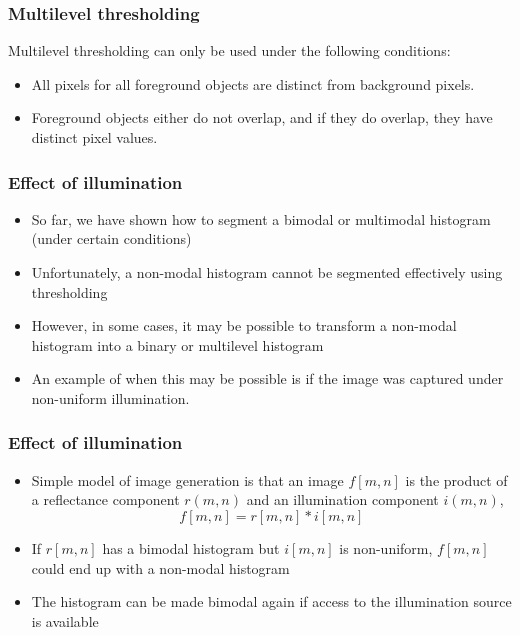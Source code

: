 \begin{frame}
\frametitle{Multilevel thresholding}
\logoCSIPCPL\mypagenum
Multilevel thresholding can only be used under the following
conditions:
	\begin{itemize}
	\item All pixels for all foreground objects are distinct from background pixels.
	\item Foreground objects either do not overlap, and if they do overlap, they have distinct pixel values.
	\end{itemize}
\end{frame}




\begin{frame}
\frametitle{Effect of illumination}
\logoCSIPCPL\mypagenum
	\begin{itemize}
		\item So far, we have shown how to segment a bimodal or multimodal histogram (under certain conditions)
		\item Unfortunately, a non-modal histogram cannot be segmented effectively using thresholding
		\item However, in some cases, it may be possible to transform a non-modal histogram into a binary or multilevel histogram
		\item An example of when this may be possible is if the image was captured under non-uniform illumination.
	\end{itemize}
\end{frame}







\begin{frame}
\frametitle{Effect of illumination}
\logoCSIPCPL\mypagenum
	\begin{itemize}
		\item Simple model of image generation is that an image $f[m,n]$ is the product of a reflectance component $r(m,n)$ and an illumination component $i(m,n)$,
			\begin{equation}\label{Eqn:OriginalImageGeneration}
				f[m,n] = r[m,n] * i[m,n]
			\end{equation}
		\item If $r[m,n]$ has a bimodal histogram but $i[m,n]$ is non-uniform, $f[m,n]$ could end up with a non-modal histogram
		\item The histogram can be made bimodal again if access to the illumination source is available
	\end{itemize}
\end{frame}






